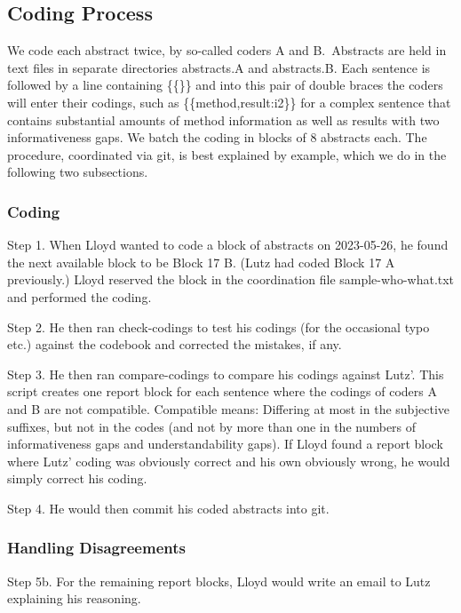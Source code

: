 \documentclass[10pt,journal,compsoc]{IEEEtran}
\newcommand{\Prg}[1]{\bgroup\ttfamily #1\egroup}  %
\begin{document}
\subsection{Coding Process}\label{meth_coding}

We code each abstract twice, by so-called coders A and B.\ 
Abstracts are held in text files in separate directories \Prg{abstracts.A} and \Prg{abstracts.B}.
Each sentence is followed by a line containing \Prg{\{\{\}\}} and into this pair of
double braces the coders will enter their codings,
such as \Prg{\{\{method,result:i2\}\}} for a complex sentence that contains substantial
amounts of method information as well as results with two informativeness gaps.
We batch the coding in blocks of 8 abstracts each.
The procedure, coordinated via git, is best explained by example, 
which we do in the following two subsections. 


\subsubsection{Coding}

\indent Step 1. When Lloyd wanted to code a block of abstracts on 2023-05-26,
he found the next available block to be Block 17 B.
(Lutz had coded Block 17 A previously.)
Lloyd reserved the block in the coordination file \Prg{sample-who-what.txt}
and performed the coding.

Step 2. He then ran \Prg{check-codings} to test his codings (for the occasional typo etc.)
against the codebook and corrected the mistakes, if any.

Step 3. He then ran \Prg{compare-codings} to compare his codings against Lutz'.
This script creates one report block for each sentence where the codings
of coders A and B are not compatible.
Compatible means: Differing at most in the subjective suffixes, but not in the codes
(and not by more than one in the numbers of informativeness gaps and understandability gaps).
If Lloyd found a report block where Lutz' coding was obviously correct and his own
obviously wrong, he would simply correct his coding.

Step 4. He would then commit his coded abstracts into git.


\subsubsection{Handling Disagreements}

\indent Step 5b. For the remaining report blocks, Lloyd would write an email to Lutz explaining his reasoning.
\end{document}
